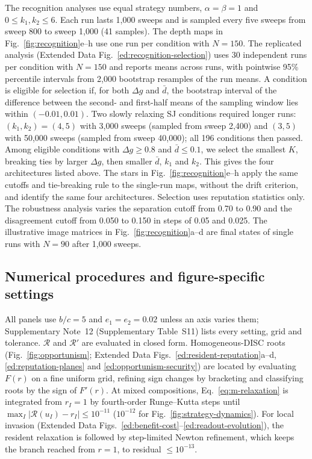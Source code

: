 The recognition analyses use equal strategy numbers, $\alpha=\beta=1$ and
$0\le k_1,k_2\le6$. Each run lasts 1,000 sweeps and is sampled every five sweeps
from sweep 800 to sweep 1,000 (41 samples). The depth maps in
Fig.~\ref{fig:recognition}e--h use one run per condition with $N=150$. The
replicated analysis (Extended Data Fig.~\ref{ed:recognition-selection}) uses 30
independent runs per condition with $N=150$ and reports means across runs, with
pointwise 95\% percentile intervals from 2,000 bootstrap resamples of the run
means. A condition is eligible for selection if, for both $\Delta g$ and
$\bar d$, the bootstrap interval of the difference between the second- and
first-half means of the sampling window lies within $(-0.01,0.01)$. Two slowly
relaxing SJ conditions required longer runs: $(k_1,k_2)=(4,5)$ with 3,000 sweeps
(sampled from sweep 2,400) and $(3,5)$ with 50,000 sweeps (sampled from sweep
40,000); all 196 conditions then passed. Among eligible conditions with
$\Delta g\ge0.8$ and $\bar d\le0.1$, we select the smallest $K$, breaking ties
by larger $\Delta g$, then smaller $\bar d$, $k_1$ and $k_2$. This gives the
four architectures listed above. The stars in Fig.~\ref{fig:recognition}e--h
apply the same cutoffs and tie-breaking rule to the single-run maps, without
the drift criterion, and identify the same four architectures. Selection uses
reputation statistics only.
The robustness analysis varies the separation cutoff from 0.70 to 0.90 and the
disagreement cutoff from 0.050 to 0.150 in steps of 0.05 and 0.025. The
illustrative image matrices in Fig.~\ref{fig:recognition}a--d are final states of
single runs with $N=90$ after 1,000 sweeps.

\subsection*{Numerical procedures and figure-specific settings}

All panels use $b/c=5$ and $e_1=e_2=0.02$ unless an axis varies them;
Supplementary Note~12 (Supplementary Table~S11) lists every setting, grid and
tolerance.
$\mathcal R$ and $\mathcal R'$ are evaluated in closed form. Homogeneous-DISC
roots (Fig.~\ref{fig:opportunism}; Extended Data
Figs.~\ref{ed:resident-reputation}a--d, \ref{ed:reputation-planes} and
\ref{ed:opportunism-security}) are located by evaluating $F(r)$ on a fine
uniform grid, refining sign changes by bracketing and classifying roots by the
sign of $F'(r)$. At mixed compositions, Eq.~\eqref{eq:m-relaxation} is
integrated from $r_I=1$ by fourth-order Runge--Kutta steps until
$\max_I|\mathcal R(u_I)-r_I|\le10^{-11}$ ($10^{-12}$ for
Fig.~\ref{fig:strategy-dynamics}). For local invasion (Extended Data
Figs.~\ref{ed:benefit-cost}--\ref{ed:readout-evolution}), the resident
relaxation is followed by step-limited Newton refinement, which keeps the
branch reached from $r=1$, to residual $\le10^{-13}$.

